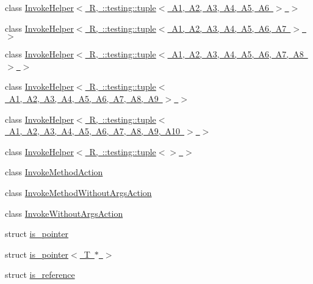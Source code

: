 \begin{DoxyCompactItemize}
\item 
class \mbox{\hyperlink{classtesting_1_1internal_1_1_invoke_helper_3_01_r_00_01_1_1testing_1_1tuple_3_01_a1_00_01_a2_00_5653fefa261cff106ebaaf9c78f6ee42}{Invoke\+Helper$<$ R, \+::testing\+::tuple$<$ A1, A2, A3, A4, A5, A6 $>$ $>$}}
\item 
class \mbox{\hyperlink{classtesting_1_1internal_1_1_invoke_helper_3_01_r_00_01_1_1testing_1_1tuple_3_01_a1_00_01_a2_00_9169216bddd5005837acd145af38ec6f}{Invoke\+Helper$<$ R, \+::testing\+::tuple$<$ A1, A2, A3, A4, A5, A6, A7 $>$ $>$}}
\item 
class \mbox{\hyperlink{classtesting_1_1internal_1_1_invoke_helper_3_01_r_00_01_1_1testing_1_1tuple_3_01_a1_00_01_a2_00_c90976166c933075c49792215d8203bb}{Invoke\+Helper$<$ R, \+::testing\+::tuple$<$ A1, A2, A3, A4, A5, A6, A7, A8 $>$ $>$}}
\item 
class \mbox{\hyperlink{classtesting_1_1internal_1_1_invoke_helper_3_01_r_00_01_1_1testing_1_1tuple_3_01_a1_00_01_a2_00_cb3e0694d0722fcc616ae618dc383e5b}{Invoke\+Helper$<$ R, \+::testing\+::tuple$<$ A1, A2, A3, A4, A5, A6, A7, A8, A9 $>$ $>$}}
\item 
class \mbox{\hyperlink{classtesting_1_1internal_1_1_invoke_helper_3_01_r_00_01_1_1testing_1_1tuple_3_01_a1_00_01_a2_00_d7025e877e4f690a17d0a7f1e26fac53}{Invoke\+Helper$<$ R, \+::testing\+::tuple$<$ A1, A2, A3, A4, A5, A6, A7, A8, A9, A10 $>$ $>$}}
\item 
class \mbox{\hyperlink{classtesting_1_1internal_1_1_invoke_helper_3_01_r_00_01_1_1testing_1_1tuple_3_4_01_4}{Invoke\+Helper$<$ R, \+::testing\+::tuple$<$$>$ $>$}}
\item 
class \mbox{\hyperlink{structtesting_1_1internal_1_1_invoke_method_action}{Invoke\+Method\+Action}}
\item 
class \mbox{\hyperlink{structtesting_1_1internal_1_1_invoke_method_without_args_action}{Invoke\+Method\+Without\+Args\+Action}}
\item 
class \mbox{\hyperlink{structtesting_1_1internal_1_1_invoke_without_args_action}{Invoke\+Without\+Args\+Action}}
\item 
struct \mbox{\hyperlink{structtesting_1_1internal_1_1is__pointer}{is\+\_\+pointer}}
\item 
struct \mbox{\hyperlink{structtesting_1_1internal_1_1is__pointer_3_01_t_01_5_01_4}{is\+\_\+pointer$<$ T $\ast$ $>$}}
\item 
struct \mbox{\hyperlink{structtesting_1_1internal_1_1is__reference}{is\+\_\+reference}}
\item 

\end{DoxyCompactItemize}
